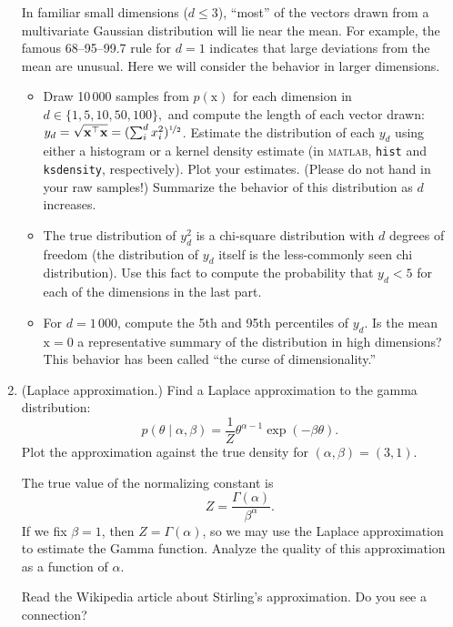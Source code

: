 \documentclass{article}
\newcommand{\acro}[1]{\textsc{\MakeLowercase{#1}}}
\newcommand{\given}{\mid}
\renewcommand{\vec}[1]{\bm{\mathrm{#1}}}
\newcommand{\trans}{^\top}
\begin{document}
\begin{enumerate}
  In familiar small dimensions ($d \leq 3$), ``most'' of the vectors
  drawn from a multivariate Gaussian distribution will lie near the
  mean.  For example, the famous 68--95--99.7 rule for $d = 1$
  indicates that large deviations from the mean are unusual.  Here we
  will consider the behavior in larger dimensions.
  \begin{itemize}
  \item Draw 10\,000 samples from $p(\vec{x})$ for each dimension in
    $d \in \{1, 5, 10, 50, 100\},$ and compute the length of each
    vector drawn: $y_d = \sqrt{\vec{x}\trans \vec{x}} = (\sum_i^d
    x_i^2)^{\nicefrac{1}{2}}$.  Estimate the distribution of each
    $y_d$ using either a histogram or a kernel density estimate (in
    \acro{MATLAB}, \texttt{hist} and \texttt{ksdensity},
    respectively).  Plot your estimates.  (Please do not hand in your
    raw samples!)  Summarize the behavior of this distribution as $d$
    increases.
  \item
    The true distribution of $y_d^2$ is a chi-square distribution with
    $d$ degrees of freedom (the distribution of $y_d$ itself is the
    less-commonly seen chi distribution).  Use this fact to compute
    the probability that $y_d < 5$ for each of the dimensions in the
    last part.
  \item
    For $d = 1\,000$, compute the 5th and 95th percentiles of $y_d$.
    Is the mean $\vec{x} = \vec{0}$ a representative summary of the
    distribution in high dimensions?  This behavior has been called
    ``the curse of dimensionality.''
  \end{itemize}

\item
  (Laplace approximation.)
  Find a Laplace approximation to the gamma distribution:
  \begin{equation*}
    p(\theta \given \alpha, \beta)
    =
    \frac{1}{Z}
    \theta^{\alpha - 1}
    \exp(-\beta\theta).
  \end{equation*}
  Plot the approximation against the true density for $(\alpha, \beta)
  = (3, 1)$.

  The true value of the normalizing constant is
  \begin{equation*}
    Z = \frac{\Gamma(\alpha)}{\beta^\alpha}.
  \end{equation*}
  If we fix $\beta = 1$, then $Z = \Gamma(\alpha)$, so we may use the
  Laplace approximation to estimate the Gamma function.  Analyze the
  quality of this approximation as a function of $\alpha$.

  Read the Wikipedia article about Stirling's approximation. Do you see
  a connection?

\end{enumerate}
\end{document}
